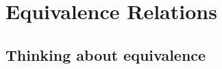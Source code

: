 \documentclass[a4paper,12pt]{book}
\title{}
\author{Rachel Morris}
\date{\today}
\newcounter{question}
\begin{document}
    \toggletrue{answerkey}
    \togglefalse{answerkey}


    \section{Equivalence Relations}

    \subsection{Thinking about equivalence}
    
\end{document}
